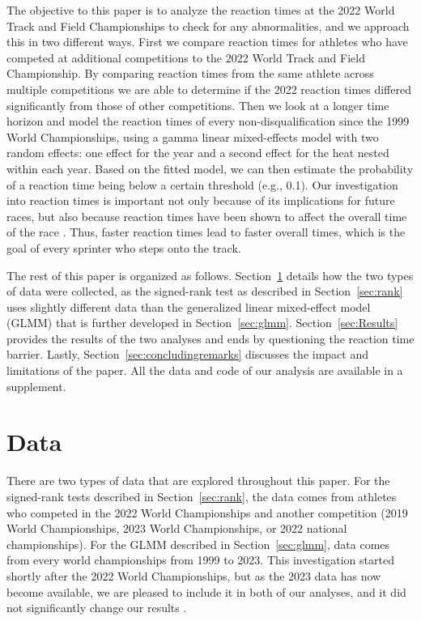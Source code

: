 \documentclass[12pt, letterpaper, titlepage]{article}
\begin{document}
The objective to this paper is to analyze the reaction times at the 2022 World 
Track and Field Championships to check for any abnormalities, and we approach
this in two different ways. First we compare reaction times for athletes who 
have competed at additional competitions to the 2022 World Track and Field 
Championship. By comparing reaction times from the same athlete across multiple
competitions we are able to determine if the 2022 reaction times differed 
significantly from those of other competitions. Then we look at a longer time horizon
and model the reaction times of every non-disqualification since the 1999 World 
Championships, using a gamma linear mixed-effects model with two random effects: 
one effect for the year and a second effect for the heat nested within each year.
Based on the fitted model, we can then estimate the probability of a reaction 
time being below a certain threshold (e.g., 0.1). 
Our investigation into reaction times is important not only because of its
implications for future races, but also because reaction times have
been shown to affect the overall time of the race \citep{delalija2008reaction}.
Thus, faster reaction times lead to faster overall times, which is the goal of
every sprinter who steps onto the track.


The rest of this paper is organized as follows. Section~\ref{sec:Data} details 
how the two types of data were collected, as the signed-rank test as described
in Section~\ref{sec:rank} uses slightly different data than the generalized 
linear mixed-effect model (GLMM) that is further developed in 
Section~\ref{sec:glmm}. Section~\ref{sec:Results} provides the results of the two
analyses and ends by questioning the reaction time barrier. Lastly, 
Section~\ref{sec:concludingremarks} discusses the impact and limitations of the
paper. All the data and code of our analysis are available in a supplement.


\section{Data} \label{sec:Data}

There are two types of data that are explored throughout this paper. For the
signed-rank tests described in Section~\ref{sec:rank}, the data comes from 
athletes who competed in the 2022 World Championships and another competition 
(2019 World Championships, 2023 World Championships, or 2022 national 
championships). For the GLMM described in Section~\ref{sec:glmm}, data comes
from every world championships from 1999 to 2023. This investigation started 
shortly after the 2022 World Championships, but as the 2023 data has now become 
available, we are pleased to include it in both of our analyses, and it did not
significantly change our results \citep{WAData}. 
\end{document}

